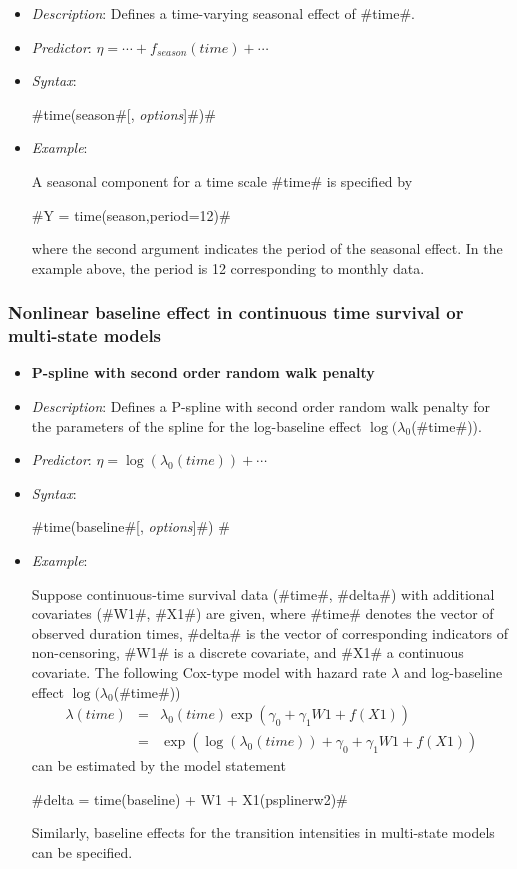 \begin{itemize}
\item[] {\em Description}: Defines a time-varying seasonal effect
of #time#. \item[] {\em Predictor}: $\eta =  \cdots +
f_{season}(time) + \cdots $ \item[] {\em Syntax}:

#time(season#[, {\em options}]#)#
\item[] {\em Example}:

A seasonal component for a time scale #time# is specified by

#Y = time(season,period=12)#

where the second argument indicates the period of the seasonal
effect. In the example above, the period is 12 corresponding to
monthly data.
\end{itemize}

\subsubsection*{Nonlinear baseline effect in continuous time survival or multi-state models}

\begin{itemize}
\item[]{\bf\sffamily P-spline with second order random walk
penalty}

\item[] {\em Description}: Defines a P-spline with second order
random walk penalty for the parameters of the spline for the
log-baseline effect $\log(\lambda_0$(#time#)). \item[] {\em
Predictor}: $\eta = \log(\lambda_0(time)) + \cdots$ \item[] {\em
Syntax}:

#time(baseline#[, {\em options}]#) # \item[] {\em Example}:

Suppose continuous-time survival data (#time#, #delta#) with
additional covariates (#W1#, #X1#) are given, where #time# denotes
the vector of observed duration times, #delta# is the vector of
corresponding indicators of non-censoring, #W1# is a discrete
covariate, and #X1# a continuous covariate. The following Cox-type
model with hazard rate $\lambda$ and log-baseline effect
$\log(\lambda_0$(#time#))
\begin{eqnarray*}
 \lambda(time) & = & \lambda_0(time)\exp (\gamma_0 + \gamma_1 W1 + f(X1))\\
 & = & \exp\left(\log(\lambda_0(time)) + \gamma_0 + \gamma_1 W1 + f(X1)\right)
\end{eqnarray*}
can be estimated by the model statement

#delta = time(baseline) + W1 + X1(psplinerw2)#

Similarly, baseline effects for the transition intensities in
multi-state models can be specified.
\end{itemize}

